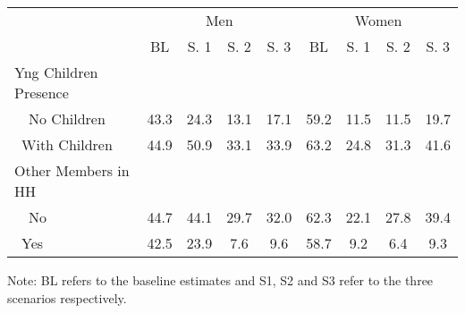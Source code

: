 \begin{tabular}{l*{8}{c}}
\hline\hline
          & \multicolumn{4}{c}{Men} & \multicolumn{4}{c}{Women} \\  \cline{2-5} \cline{6-9}
            &    BL&  S. 1&  S. 2&  S. 3&    BL&  S. 1&  S. 2&  S. 3\\
Yng Children Presence & \multicolumn{8}{c}{} \\ 
\ \ No Children&          43.3&        24.3&        13.1&        17.1&        59.2&        11.5&        11.5&        19.7\\
\ With Children&        44.9&        50.9&        33.1&        33.9&        63.2&        24.8&        31.3&        41.6\\
\midrule

Other Members in HH    & \multicolumn{8}{c}{} \\ 
\ \ No      &        44.7&        44.1&        29.7&        32.0&        62.3&        22.1&        27.8&        39.4\\
\ Yes       &        42.5&        23.9&         7.6&         9.6&        58.7&         9.2&         6.4&         9.3\\
\hline\hline
\end{tabular}
\footnotesize Note: BL refers to the baseline estimates and S1, S2 and S3 refer to the three scenarios respectively.
